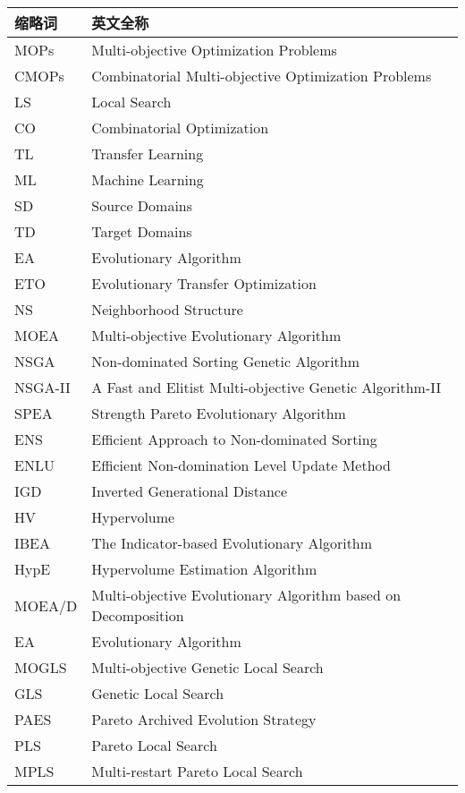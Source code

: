 \noindent\begin{tabu} to \textwidth {|X[1,c]|X[4,c]|}\hline
缩略词 & 英文全称 \\ \hline
MOPs & Multi-objective Optimization Problems \\ \hline
CMOPs & Combinatorial Multi-objective Optimization Problems \\ \hline
LS & Local Search \\ \hline
CO & Combinatorial Optimization \\ \hline
TL & Transfer Learning \\ \hline
ML & Machine Learning \\ \hline
SD & Source Domains \\ \hline
TD & Target Domains \\ \hline
EA & Evolutionary Algorithm \\ \hline
ETO & Evolutionary Transfer Optimization  \\ \hline
NS & Neighborhood Structure \\ \hline
MOEA & Multi-objective Evolutionary Algorithm \\ \hline
NSGA & Non-dominated Sorting Genetic Algorithm \\ \hline
NSGA-II & A Fast and Elitist Multi-objective Genetic Algorithm-II \\ \hline
SPEA & Strength Pareto Evolutionary Algorithm \\ \hline
ENS & Efficient Approach to Non-dominated Sorting \\ \hline
ENLU & Efficient Non-domination Level Update Method \\ \hline
IGD & Inverted Generational Distance \\ \hline
HV & Hypervolume \\ \hline
IBEA & The Indicator-based Evolutionary Algorithm \\ \hline
HypE & Hypervolume Estimation Algorithm \\ \hline
MOEA/D & Multi-objective Evolutionary Algorithm based on Decomposition \\ \hline
EA & Evolutionary Algorithm \\ \hline
MOGLS & Multi-objective Genetic Local Search \\ \hline
GLS & Genetic Local Search \\ \hline
PAES & Pareto Archived Evolution Strategy \\ \hline
PLS & Pareto Local Search \\ \hline
MPLS & Multi-restart Pareto Local Search \\ \hline
\end{tabu}
